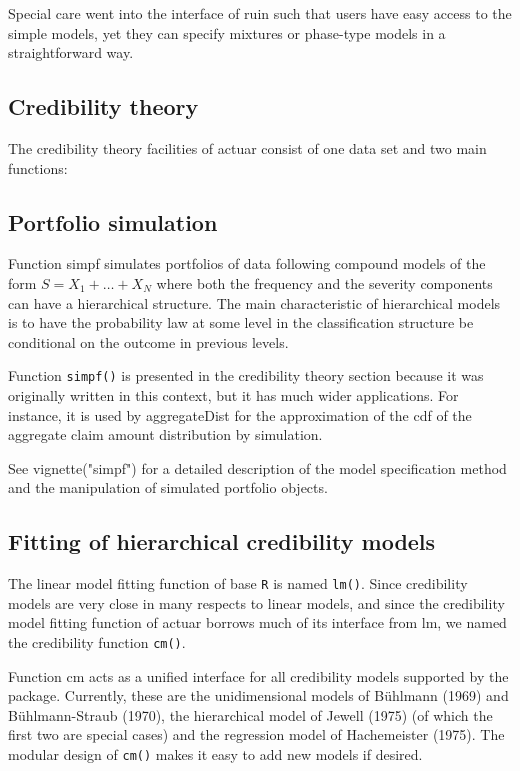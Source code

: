 \documentclass[12pt]{article}
\begin{document}
Special care went into the interface of ruin such that users have easy access to the simple models, yet they can specify mixtures or phase-type models in a straightforward way.

\subsection{Credibility theory}

The credibility theory facilities of actuar consist of one data set and two main functions: 

\subsection{Portfolio simulation}

Function simpf simulates portfolios of data following compound models of the form $S = X_1 + \ldots + X_N$ where both the frequency and the severity components can have a hierarchical structure. The main characteristic of hierarchical models is to have the probability law at some level in the classification structure be conditional on the outcome in previous levels.

Function \texttt{simpf()} is presented in the credibility theory section because it was originally written in this context, but it has much wider applications. For instance, it is used by aggregateDist for the approximation of the cdf of the aggregate claim amount distribution by simulation.

See vignette("simpf") for a detailed description of the model specification method and the manipulation of simulated portfolio objects.

\subsection{Fitting of hierarchical credibility models}

The linear model fitting function of base \texttt{R} is named \texttt{lm()}. Since credibility models are very close in many respects to linear models, and since the credibility model fitting function of actuar borrows much of its interface from lm, we named the credibility function \texttt{cm()}.

Function cm acts as a unified interface for all credibility models supported by the package. Currently, these are the unidimensional models of Bühlmann (1969) and Bühlmann-Straub (1970), the hierarchical model of Jewell (1975) (of which the first two are special cases) and the regression model of Hachemeister (1975). The modular design of \texttt{cm()} makes it easy to add new models if desired.
\end{document}
